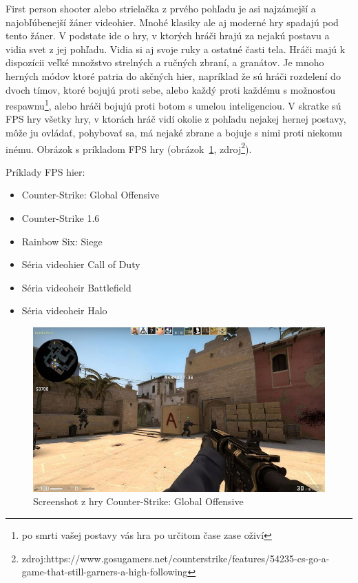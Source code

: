 \documentclass[10pt,oneside,slovak,a4paper]{article}
\begin{document}
First person shooter alebo strielačka z prvého pohľadu je asi najzámejší a najobľúbenejší žáner videohier. Mnohé klasiky ale aj moderné hry spadajú pod tento žáner. V podstate ide o hry, v ktorých hráči hrajú za nejakú postavu a vidia svet z jej pohľadu. Vidia si aj svoje ruky a ostatné časti tela. Hráči majú k dispozícii veľké množstvo strelných a ručných zbraní, a granátov. Je mnoho herných módov ktoré patria do akčných hier, napríklad že sú hráči rozdelení do dvoch tímov, ktoré bojujú proti sebe, alebo každý proti každému s možnosťou respawnu\footnote{po smrti vašej postavy vás hra po určitom čase zase oživí}, alebo hráči bojujú proti botom s umelou inteligenciou. V skratke sú FPS hry všetky hry, v ktorách hráč vidí okolie z pohľadu nejakej hernej postavy, môže ju ovládať, pohybovať sa, má nejaké zbrane a bojuje s nimi proti niekomu inému. Obrázok s príkladom FPS hry (obrázok~\ref{f:csgo}, zdroj\footnote{zdroj:https://www.gosugamers.net/counterstrike/features/54235-cs-go-a-game-that-still-garners-a-high-following}). 

Príklady FPS hier:
\begin{itemize}
\item Counter-Strike: Global Offensive
\item Counter-Strike 1.6
\item Rainbow Six: Siege
\item Séria videohier Call of Duty
\item Séria videoheir Battlefield
\item Séria videoheir Halo
\end{itemize}

\begin{figure}[ht]
\centering
\includegraphics[scale=0.16]{csgo.jpg}
\caption{Screenshot z hry Counter-Strike: Global Offensive}
\label{f:csgo}
\end{figure}
\end{document}
